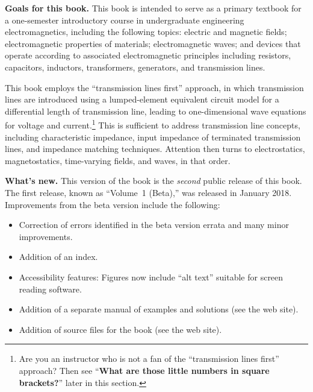 

\label{m0146_Preface-About_This_Book} %

{\bf Goals for this book.}
This book is intended to serve as a primary textbook for a one-semester introductory course in undergraduate engineering electromagnetics, 
including the following topics: 
electric and magnetic fields; 
electromagnetic properties of materials;
electromagnetic waves;
and devices that operate according to associated electromagnetic principles including 
resistors, 
capacitors, 
inductors, 
transformers, 
generators,
and
transmission lines.

This book employs the ``transmission lines first'' approach, in which transmission lines are introduced using a lumped-element equivalent circuit model for a differential length of transmission line, leading to one-dimensional wave equations for voltage and current.\footnote{Are you an instructor who is not a fan of the ``transmission lines first'' approach?  Then see ``{\bf What are those little numbers in square brackets?}'' later in this section.} 
This is sufficient to address transmission line concepts, including characteristic impedance, input impedance of terminated transmission lines, and impedance matching techniques.
Attention then turns to electrostatics, magnetostatics, time-varying fields, and waves, in that order.
 
{\bf What's new.}
This version of the book is the \emph{second} public release of this book.
The first release, known as ``Volume~1 (Beta),'' was released in January 2018.
Improvements from the beta version include the following:
%
\begin{itemize}
\item Correction of errors identified in the beta version errata and many minor improvements.
\item Addition of an index.
\item Accessibility features: Figures now include ``alt text'' suitable for screen reading software.
\item Addition of a separate manual of examples and solutions (see the web site).
\item Addition of source files for the book (see the web site).
\end{itemize}
 
